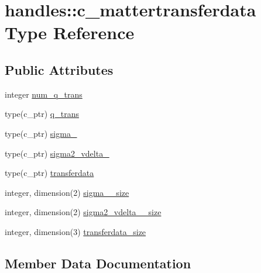 \hypertarget{structhandles_1_1c__mattertransferdata}{}\section{handles\+:\+:c\+\_\+mattertransferdata Type Reference}
\label{structhandles_1_1c__mattertransferdata}
\subsection*{Public Attributes}
\begin{DoxyCompactItemize}
\item 
integer \mbox{\hyperlink{structhandles_1_1c__mattertransferdata_a6ebb5593cd9d3e05b532e124e281f387}{num\+\_\+q\+\_\+trans}}
\item 
type(c\+\_\+ptr) \mbox{\hyperlink{structhandles_1_1c__mattertransferdata_ae2885da517e6e51197f469067dd809dc}{q\+\_\+trans}}
\item 
type(c\+\_\+ptr) \mbox{\hyperlink{structhandles_1_1c__mattertransferdata_a0f3662cb92341f678a5204c000e213fe}{sigma\+\_}}
\item 
type(c\+\_\+ptr) \mbox{\hyperlink{structhandles_1_1c__mattertransferdata_ac3ba008d115162eb9978a314e9bad8c3}{sigma2\+\_\+vdelta\+\_}}
\item 
type(c\+\_\+ptr) \mbox{\hyperlink{structhandles_1_1c__mattertransferdata_a0bef953305449e70301e4134bebb15b7}{transferdata}}
\item 
integer, dimension(2) \mbox{\hyperlink{structhandles_1_1c__mattertransferdata_a738045dbe17d5a9e1d51e40faeb8d32a}{sigma\+\_\+\_\+size}}
\item 
integer, dimension(2) \mbox{\hyperlink{structhandles_1_1c__mattertransferdata_a8df076bb138963b3caefd2fc3b971221}{sigma2\+\_\+vdelta\+\_\+\_\+size}}
\item 
integer, dimension(3) \mbox{\hyperlink{structhandles_1_1c__mattertransferdata_a0a2ed86af980999c508eee127d9cb2bc}{transferdata\+\_\+size}}
\end{DoxyCompactItemize}


\subsection{Member Data Documentation}
\mbox{\label{structhandles_1_1c__mattertransferdata_a6ebb5593cd9d3e05b532e124e281f387}} 
